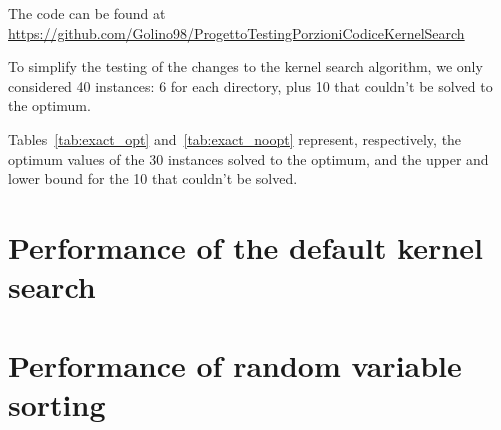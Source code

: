 The code can be found at \url{https://github.com/Golino98/ProgettoTestingPorzioniCodiceKernelSearch}

To simplify the testing of the changes to the kernel search algorithm,
we only considered 40 instances: 6 for each directory,
plus 10 that couldn't be solved to the optimum.

Tables~\ref{tab:exact_opt} and~\ref{tab:exact_noopt} represent,
respectively, the optimum values of the 30 instances solved to
the optimum, and the upper and lower bound for the 10
that couldn't be solved.





\section{Performance of the default kernel search}


\section{Performance of random variable sorting}
